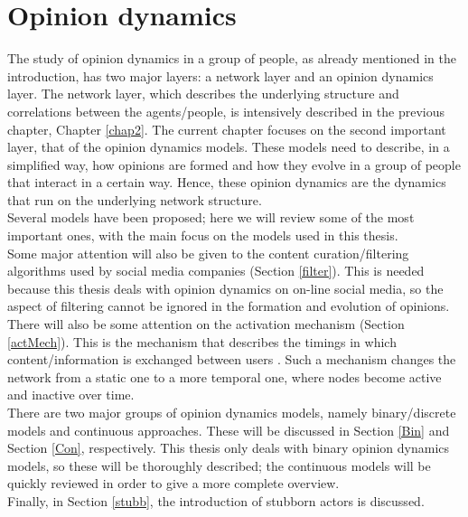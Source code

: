 \documentclass[11 pt , letterpaper , twoside , openright]{book}
\begin{document}
\chapter{Opinion dynamics}
\label{chap3}
The study of opinion dynamics in a group of people, as already mentioned in the introduction, has two major layers: a network layer and an opinion dynamics layer. The network layer, which describes the underlying structure and correlations between the agents/people, is intensively described in the previous chapter, Chapter \ref{chap2}. The current chapter focuses on the second important layer, that of the opinion dynamics models. These models need to describe, in a simplified way, how opinions are formed and how they evolve in a group of people that interact in a certain way. Hence, these opinion dynamics are the dynamics that run on the underlying network structure.\\
\newline
Several models have been proposed; here we will review some of the most important ones, with the main focus on the models used in this thesis.\\
\newline
Some major attention will also be given to the content curation/filtering algorithms used by social media companies (Section \ref{filter}). This is needed because this thesis deals with opinion dynamics on on-line social media, so the aspect of filtering cannot be ignored in the formation and evolution of opinions.\\
\newline
There will also be some attention on the activation mechanism (Section \ref{actMech}). This is the mechanism that describes the timings in which content/information is exchanged between users \cite{Perra2019}. Such a mechanism changes the network from a static one to a more temporal one, where nodes become active and inactive over time. \\
\newline
There are two major groups of opinion dynamics models, namely binary/discrete models and continuous approaches. These will be discussed in Section \ref{Bin} and Section \ref{Con}, respectively. This thesis only deals with binary opinion dynamics models, so these will be thoroughly described; the continuous models will be quickly reviewed in order to give a more complete overview.\\
\newline
Finally, in Section \ref{stubb}, the introduction of stubborn actors is discussed.
\end{document}
